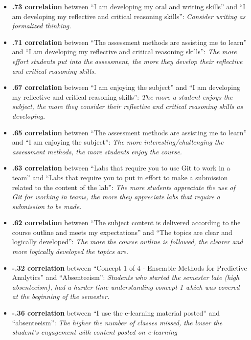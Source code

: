 \documentclass[
]{article}
\begin{document}
\begin{itemize}
\item
  \textbf{.73 correlation} between ``I am developing my oral and writing
  skills'' and ``I am developing my reflective and critical reasoning
  skills'': \emph{Consider writing as formalized thinking.}
\item
  \textbf{.71 correlation} between ``The assessment methods are
  assisting me to learn'' and ``I am developing my reflective and
  critical reasoning skills'': \emph{The more effort students put into
  the assessment, the more they develop their reflective and critical
  reasoning skills.}
\item
  \textbf{.67 correlation} between ``I am enjoying the subject'' and ``I
  am developing my reflective and critical reasoning skills'': \emph{The
  more a student enjoys the subject, the more they consider their
  reflective and critical reasoning skills as developing.}
\item
  \textbf{.65 correlation} between ``The assessment methods are
  assisting me to learn'' and ``I am enjoying the subject'': \emph{The
  more interesting/challenging the assessment methods, the more students
  enjoy the course.}
\item
  \textbf{.63 correlation} between ``Labs that require you to use Git to
  work in a team'' and ``Labs that require you to put in effort to make
  a submission related to the content of the lab'': \emph{The more
  students appreciate the use of Git for working in teams, the more they
  appreciate labs that require a submission to be made.}
\item
  \textbf{.62 correlation} between ``The subject content is delivered
  according to the course outline and meets my expectations'' and ``The
  topics are clear and logically developed'': \emph{The more the course
  outline is followed, the clearer and more logically developed the
  topics are.}
\item
  \textbf{-.32 correlation} between ``Concept 1 of 4 - Ensemble Methods
  for Predictive Analytics'' and ``Absenteeism'': \emph{Students who
  started the semester late (high absenteeism), had a harder time
  understanding concept 1 which was covered at the beginning of the
  semester.}
\item
  \textbf{-.36 correlation} between ``I use the e-learning material
  posted'' and ``absenteeism'': \emph{The higher the number of classes
  missed, the lower the student's engagement with content posted on
  e-learning}
\end{itemize}
\end{document}
